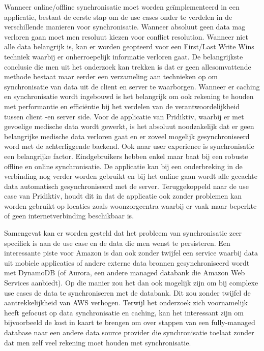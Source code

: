 Wanneer online/offline synchronisatie moet worden ge\"implementeerd in een applicatie,  bestaat de eerste stap om de use cases onder te verdelen in de verschillende manieren voor synchronisatie. Wanneer absoluut geen data mag verloren gaan moet men resoluut kiezen voor conflict resolution. Wanneer niet alle data belangrijk is, kan er worden geopteerd voor een First/Last Write Wins techniek waarbij er onherroepelijk informatie verloren gaat. De belangrijkste conclusie die men uit het onderzoek kan trekken is dat er geen allesomvattende methode bestaat maar eerder een verzameling aan technieken op om synchronisatie van data uit de client en server te waarborgen. Wanneer er caching en synchronisatie wordt ingebouwd is het belangrijk om ook rekening te houden met performantie en effici\"entie bij het verdelen van de verantwoordelijkheid tussen client -en server side. Voor de applicatie van Pridiktiv, waarbij er met gevoelige medische data wordt gewerkt, is het absoluut noodzakelijk dat er geen belangrijke medische data verloren gaat en er zoveel mogelijk gesynchroniseerd word met de achterliggende backend. Ook naar user experience is synchronisatie een belangrijke factor. Eindgebruikers hebben enkel maar baat bij een robuste offline en online synchronisatie. 
\clearpage
De applicatie kan bij een onderbreking in de verbinding nog verder worden gebruikt en bij het online gaan wordt alle gecachte data automatisch gesynchroniseerd met de server. Teruggekoppeld naar de use case van Pridiktiv, houdt dit in dat de applicatie ook zonder problemen kan worden gebruikt op locaties zoals woonzorgcentra waarbij er vaak maar beperkte of geen internetverbinding beschikbaar is.

Samengevat kan er worden gesteld dat het probleem van synchronisatie zeer specifiek is aan de use case en de data die men wenst te persisteren. Een interessante piste voor Amazon is dan ook zonder twijfel een service waarbij data uit mobiele applicaties of andere externe data bronnen gesynchroniseerd wordt met DynamoDB (of Aurora, een andere managed databank die Amazon Web Services aanbiedt). Op die manier zou het dan ook mogelijk zijn om bij complexe use cases de data te synchroniseren met de databank. Dit zou zonder twijfel de aantrekkelijkheid van AWS verhogen. Terwijl het onderzoek zich voornamelijk heeft gefocust op data synchronisatie en caching, kan het interessant zijn om bijvoorbeeld de kost in kaart te brengen om over stappen van een fully-managed database naar een andere data source provider die synchronisatie toelaat zonder dat men zelf veel rekening moet houden met synchronisatie.
